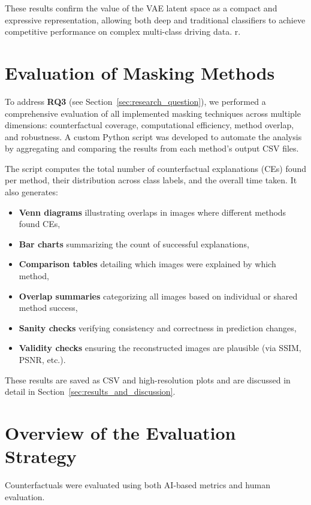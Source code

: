 These results confirm the value of the VAE latent space as a compact and expressive representation, allowing both deep and traditional classifiers to achieve competitive performance on complex multi-class driving data.
r. 













\section{Evaluation of Masking Methods} \label{sec:evaluation}
To address \textbf{RQ3} (see Section~\ref{sec:research_question}), we performed a comprehensive evaluation of all implemented masking techniques across multiple dimensions: counterfactual coverage, computational efficiency, method overlap, and robustness. A custom Python script was developed to automate the analysis by aggregating and comparing the results from each method's output CSV files.

The script computes the total number of counterfactual explanations (CEs) found per method, their distribution across class labels, and the overall time taken. It also generates:

\begin{itemize}
    \item \textbf{Venn diagrams} illustrating overlaps in images where different methods found CEs,
    \item \textbf{Bar charts} summarizing the count of successful explanations,
    \item \textbf{Comparison tables} detailing which images were explained by which method,
    \item \textbf{Overlap summaries} categorizing all images based on individual or shared method success,
    \item \textbf{Sanity checks} verifying consistency and correctness in prediction changes,
    \item \textbf{Validity checks} ensuring the reconstructed images are plausible (via SSIM, PSNR, etc.).
\end{itemize}

These results are saved as CSV and high-resolution plots and are discussed in detail in Section~\ref{sec:results_and_discussion}.




\section{Overview of the Evaluation Strategy}
Counterfactuals were evaluated using both AI-based metrics and human evaluation.

